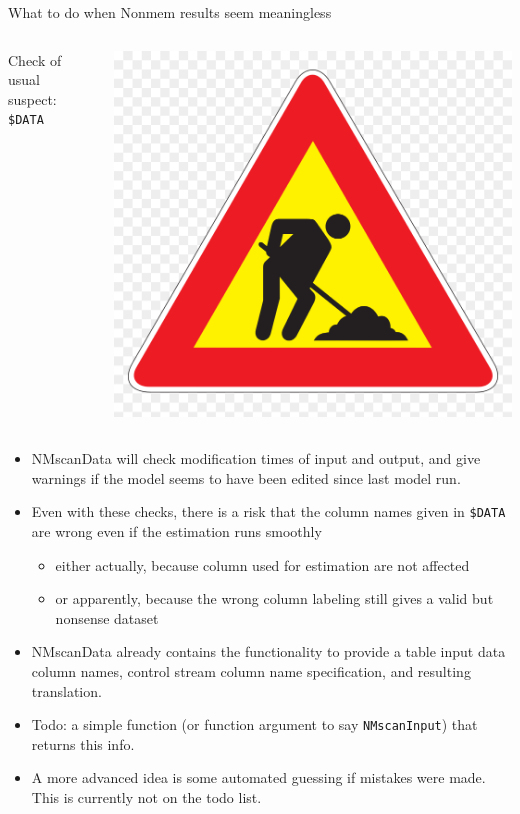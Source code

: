 \documentclass[
  8pt,
  ignorenonframetext,
  aspectratio=169]{beamer}
\providecommand{\tightlist}{%
  \setlength{\itemsep}{0pt}\setlength{\parskip}{0pt}}
\begin{document}
\begin{frame}[fragile]{What to do when Nonmem results seem meaningless}
\protect\hypertarget{what-to-do-when-nonmem-results-seem-meaningless}{}
\begin{columns}[T]
\begin{column}{0.85\textwidth}
Check of usual suspect: \texttt{\$DATA}
\end{column}

\begin{column}{0.15\textwidth}
\includegraphics[width=.5in]{figures/worksign.png}
\end{column}
\end{columns}

\begin{itemize}
\tightlist
\item
  NMscanData will check modification times of input and output, and give
  warnings if the model seems to have been edited since last model run.
\item
  Even with these checks, there is a risk that the column names given in
  \texttt{\$DATA} are wrong even if the estimation runs smoothly

  \begin{itemize}
  \tightlist
  \item
    either actually, because column used for estimation are not affected
  \item
    or apparently, because the wrong column labeling still gives a valid
    but nonsense dataset
  \end{itemize}
\item
  NMscanData already contains the functionality to provide a table input
  data column names, control stream column name specification, and
  resulting translation.
\item
  Todo: a simple function (or function argument to say
  \texttt{NMscanInput}) that returns this info.
\item
  A more advanced idea is some automated guessing if mistakes were made.
  This is currently not on the todo list.
\end{itemize}
\end{frame}
\end{document}
